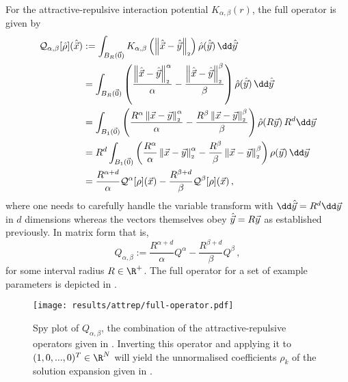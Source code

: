 For the attractive-repulsive interaction potential $K_{\alpha,\beta}(r)$, the full operator is given by
\begin{align*}
  \mathcal{Q}_{\alpha, \beta}[\hat{\rho}](\hatvec{x}) & := \int_{B_R(\vec{0})} K_{\alpha,\beta}\left(\norm{\hatvec{x} - \hatvec{y}}\right) \hat{\rho}(\hatvec{y}) \,\dd\hatvec{y}                                                               \\
                                                      & = \int_{B_R(\vec{0})} \left(\frac{\norm{\hatvec{x} - \hatvec{y}}^\alpha}{\alpha} - \frac{\norm{\hatvec{x} - \hatvec{y}}^\beta}{\beta}\right) \hat{\rho}(\hatvec{y}) \,\dd\hatvec{y}     \\
                                                      & = \int_{B_1(\vec{0})} \left(\frac{R^\alpha \norm{\vec{x} - \vec{y}}^\alpha}{\alpha} - \frac{R^\beta \norm{\vec{x} - \vec{y}}^\beta}{\beta}\right) \hat{\rho}(R\vec{y}) \, R^d\dd\vec{y} \\
                                                      & = R^d\int_{B_1(\vec{0})} \left(\frac{R^\alpha}{\alpha}\norm{\vec{x} - \vec{y}}^\alpha - \frac{R^\beta}{\beta} \norm{\vec{x} - \vec{y}}^\beta\right) \rho(\vec{y}) \,\dd\vec{y}          \\
                                                      & = \frac{R^{\alpha+d}}{\alpha} \mathcal{Q}^\alpha[\rho](\vec{x}) - \frac{R^{\beta+d}}{\beta} \mathcal{Q}^\beta[\rho](\vec{x})\,,
\end{align*}
where one needs to carefully handle the variable transform with $\dd\hatvec{y} = R^d \dd\vec{y}$ in $d$ dimensions whereas the vectors themselves obey $\hat{\vec{y}} = R \vec{y}$ as established previously.
In matrix form that is,
\begin{equation}
  Q_{\alpha, \beta} := \frac{R^{\alpha+d}}{\alpha} Q^\alpha - \frac{R^{\beta+d}}{\beta} Q^\beta\,,
  \label{eq:full-attrep-operator}
\end{equation}
for some interval radius $R \in \R^+$.
The full operator for a set of example parameters is depicted in .

\begin{figure}[H]
  \centering
  \texttt{[image: results/attrep/full-operator.pdf]}
  \caption[Combination of the attractive-repulsive operators]{Spy plot of $Q_{\alpha, \beta}$, the combination of the attractive-repulsive operators given in . Inverting this operator and applying it to $(1, 0, ..., 0)^T \in \R^N$ will yield the unnormalised coefficients $\rho_k$ of the solution expansion given in .}
  \label{fig:attrep-operator}
\end{figure}
